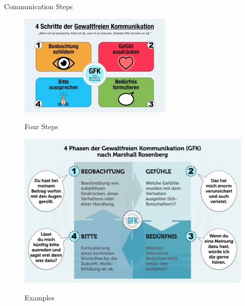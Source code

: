 Communication Steps

\begin{figure}[H]
\centering
\caption {Four Steps}
\includegraphics[width=\linewidth]{images/images.png}
\label{fig:fourSteps}
\end{figure}

\begin{figure}[H]
\centering
\caption {Examples}
\includegraphics[width=\linewidth]{images/Gewaltfreie-Kommunikation-Beispiele.jpeg}
\label{fig:examples}
\end{figure}
